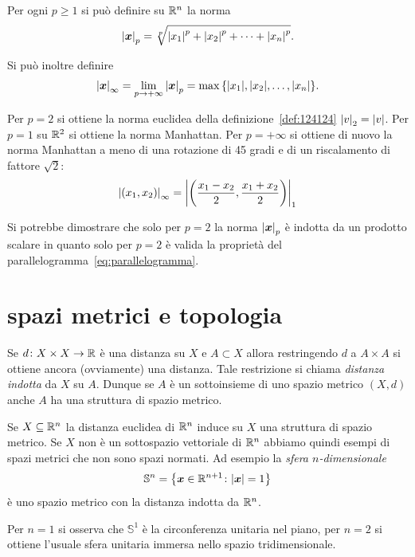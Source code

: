 \begin{example}[norma $p$]
\label{ex:norma_p}%
Per ogni $p\ge 1$ si può definire su ${\mathbb R}^n$ la norma
%
%
%
\[
  {\left|\boldsymbol x\right|}_p = \sqrt[p]{{\left|x_1\right|}^p + {\left|x_2\right|}^p + \dots + {\left|x_n\right|}^p}.
\]

Si può inoltre definire
\[
  {\left|\boldsymbol x\right|}_\infty = \lim_{p\to +\infty} {\left|\boldsymbol x\right|}_p
   = \max{\left\{ {\left|x_1\right|}, {\left|x_2\right|}, \dots, {\left|x_n\right|} \right\}}.
\]

Per $p=2$ si ottiene la norma euclidea della definizione~\ref{def:124124}
${\left|v\right|}_2={\left|v\right|}$.
Per $p=1$
su ${\mathbb R}^2$ si ottiene la norma Manhattan.
Per $p=+\infty$ si ottiene di nuovo
la norma Manhattan a meno di una rotazione di 45 gradi e di un riscalamento
di fattore $\sqrt 2$:
\[
  {\left|(x_1,x_2)\right|}_\infty
  = {\left|{\left( \frac{x_1-x_2} 2, \frac {x_1+x_2}2 \right)}\right|}_1
\]

Si potrebbe dimostrare che solo per $p=2$ la norma ${\left|\boldsymbol x\right|}_p$ è indotta
da un prodotto scalare in quanto solo per $p=2$ è valida
la proprietà del parallelogramma~\eqref{eq:parallelogramma}.
\end{example}


\section{spazi metrici e topologia}

\begin{definition}
Se $d\colon X\times X \to {\mathbb R}$ è una distanza su $X$
e $A \subset X$
allora restringendo $d$ a $A \times A$ si ottiene ancora (ovviamente) una distanza.
Tale restrizione si chiama \emph{distanza indotta}
%
%
da $X$ su $A$.
Dunque se $A$ è un sottoinsieme di uno spazio metrico $(X,d)$ anche $A$ ha una struttura di spazio metrico.
\end{definition}

\begin{example}[sfera]
Se $X\subseteq {\mathbb R}^n$ la distanza euclidea di ${\mathbb R}^n$ induce
su $X$ una struttura di spazio metrico. Se $X$ non è un sottospazio vettoriale di ${\mathbb R}^n$ abbiamo quindi esempi di spazi metrici che non sono spazi normati. Ad esempio
la \emph{sfera $n$-dimensionale}%
%
\[
  \mathbb S^n = {\left\{ \boldsymbol x \in {\mathbb R}^{n+1}\colon {\left|\boldsymbol x\right|} = 1 \right\}}
\]
è uno spazio metrico con la distanza indotta da ${\mathbb R}^n$.

Per $n=1$ si osserva che $\mathbb S^1$ è la circonferenza unitaria nel piano, 
per $n=2$ si ottiene l'usuale sfera unitaria immersa nello spazio tridimensionale.
\end{example}

